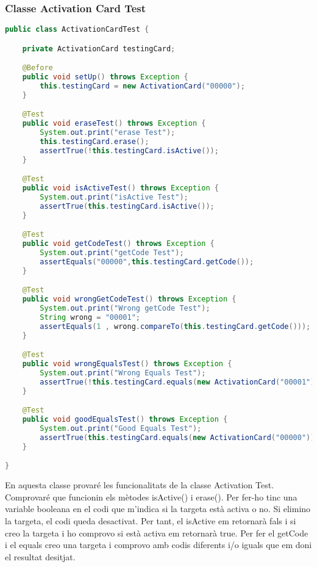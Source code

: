 \documentclass[11pt]{article}
\begin{document}
	\subsubsection{Classe Activation Card Test}
	\begin{lstlisting}[basicstyle=\ttfamily\scriptsize,language=Java]
public class ActivationCardTest {

    private ActivationCard testingCard;

    @Before
    public void setUp() throws Exception {
        this.testingCard = new ActivationCard("00000");
    }

    @Test
    public void eraseTest() throws Exception {
        System.out.print("erase Test");
        this.testingCard.erase();
        assertTrue(!this.testingCard.isActive());
    }

    @Test
    public void isActiveTest() throws Exception {
        System.out.print("isActive Test");
        assertTrue(this.testingCard.isActive());
    }

    @Test
    public void getCodeTest() throws Exception {
        System.out.print("getCode Test");
        assertEquals("00000",this.testingCard.getCode());
    }

    @Test
    public void wrongGetCodeTest() throws Exception {
        System.out.print("Wrong getCode Test");
        String wrong = "00001";
        assertEquals(1 , wrong.compareTo(this.testingCard.getCode()));
    }

    @Test
    public void wrongEqualsTest() throws Exception {
        System.out.print("Wrong Equals Test");
        assertTrue(!this.testingCard.equals(new ActivationCard("00001")));
    }

    @Test
    public void goodEqualsTest() throws Exception {
        System.out.print("Good Equals Test");
        assertTrue(this.testingCard.equals(new ActivationCard("00000")));
    }

}
	\end{lstlisting}
	En aquesta classe provaré les funcionalitats de la classe Activation Test. Comprovaré que funcionin els mètodes isActive() i erase(). Per fer-ho tinc una variable booleana en el codi que m'indica si la targeta està activa o no. Si elimino la targeta, el codi queda desactivat. Per tant, el isActive em retornarà fals i si creo la targeta i ho comprovo si està activa em retornarà true. Per fer el getCode i el equals creo una targeta i comprovo amb codis diferents i/o iguals que em doni el resultat desitjat.
\newpage
\end{document}
